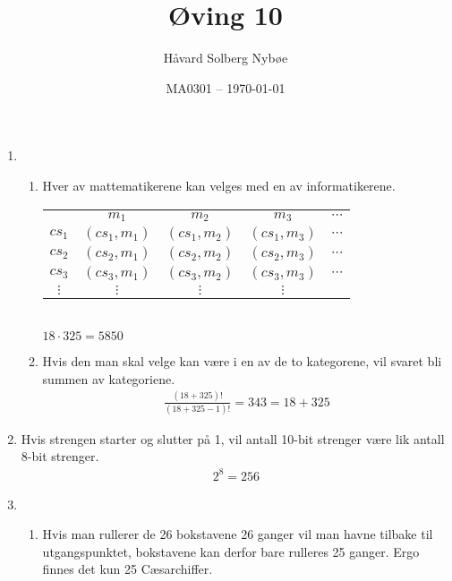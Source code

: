 \documentclass[a4paper, 12pt]{article}  %
\title{Øving 10}                        %
\author{Håvard Solberg Nybøe}           %
\date{MA0301 -- \today}                 %
\begin{document}
\maketitle

\begin{enumerate}
    \item [\boxed{1}]
    \begin{enumerate}
        \item Hver av mattematikerene kan velges med en av informatikerene. 
        \newline
        \begin{center}
            \begin{tabular}{ccccc}
                       & $m_1$ & $m_2$ & $m_3$ & $\cdots$\\
                $cs_1$ & $(cs_1, m_1)$ & $(cs_1, m_2)$ & $(cs_1, m_3)$ & $\cdots$\\
                $cs_2$ & $(cs_2, m_1)$ & $(cs_2, m_2)$ & $(cs_2, m_3)$ & $\cdots$\\
                $cs_3$ & $(cs_3, m_1)$ & $(cs_3, m_2)$ & $(cs_3, m_3)$ & $\cdots$\\
                $\vdots$ & $\vdots$ & $\vdots$ & $\vdots$ & \\
            \end{tabular}
            \\[1em]
            \(18 \cdot 325 = \boxed{5850}\)
        \end{center}
        \item Hvis den man skal velge kan være i en av de to kategorene, vil svaret bli summen av kategoriene.
        \begin{align*}
            \frac{(18+325)!}{(18+325-1)!} = \boxed{343} = 18 + 325
        \end{align*}
    \end{enumerate}
    \item [\boxed{2}] Hvis strengen starter og slutter på 1, vil antall 10-bit strenger være lik antall 8-bit strenger.
    \begin{align*}
        2^8 = \boxed{256}
    \end{align*}
    \item [\boxed{3}] 
    \begin{enumerate}
        \item Hvis man rullerer de 26 bokstavene 26 ganger vil man havne tilbake til utgangspunktet, bokstavene kan derfor bare rulleres 25 ganger. Ergo finnes det kun 25 Cæsarchiffer.

\end{enumerate}
\end{enumerate}
\end{document}
